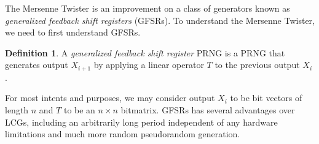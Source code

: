 \documentclass[titlepage]{article}
\theoremstyle{definition}
\newtheorem{definition}{Definition}[section]
\begin{document}
The Mersenne Twister is an improvement on a class of generators known as \textit{generalized feedback shift registers} (GFSRs). To understand the Mersenne Twister, we need to first understand GFSRs.

\begin{definition}
A \textit{generalized feedback shift register} PRNG is a PRNG that generates output $X_{i+1}$ by applying a linear operator $T$ to the previous output $X_{i}$ \cite{GFSR}.
\end{definition}

For most intents and purposes, we may consider output $X_i$ to be bit vectors of length $n$ and $T$ to be an $n \times n$ bitmatrix. GFSRs has several advantages over LCGs, including an arbitrarily long period independent of any hardware limitations and much more random pseudorandom generation.
\end{document}
